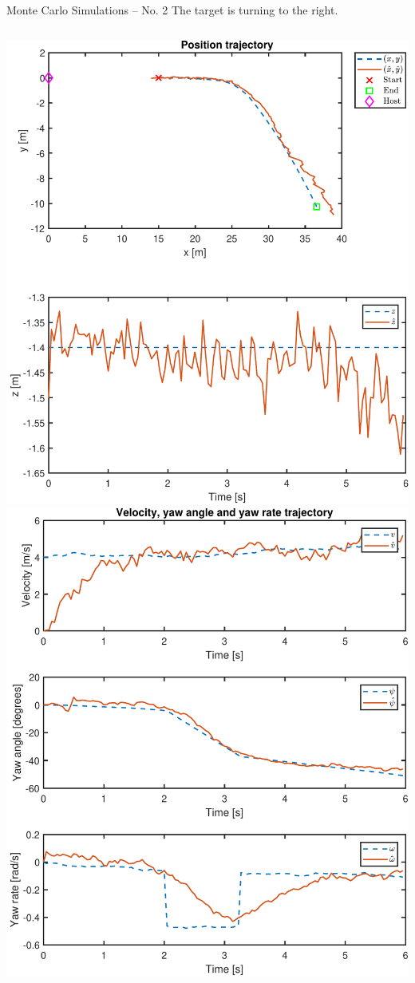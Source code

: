 \documentclass{beamer}
\begin{document}
\begin{frame}{Monte Carlo Simulations -- No. 2}
	The target is turning to the right.
	\vspace{1em}
	\begin{columns}
	\includegraphics[width=\textwidth]{Traj/23_MC_TrajPos}
	\includegraphics[width=\textwidth]{Traj/23_MC_TrajOther}
	\end{columns}
\end{frame}
\end{document}
